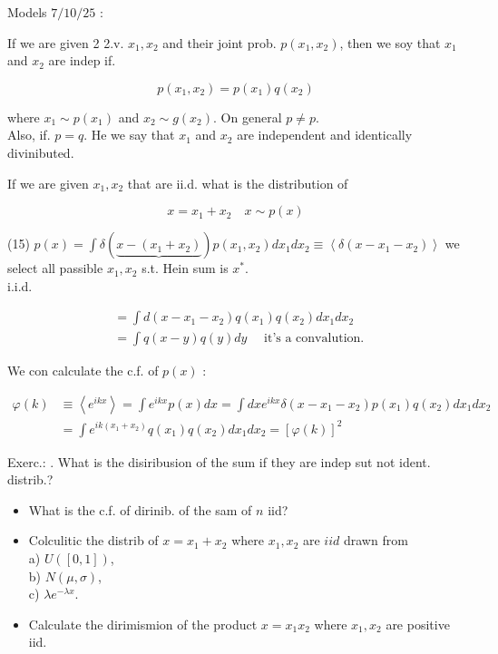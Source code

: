 \documentclass[10pt]{article}
\begin{document}
Models $7 / 10 / 25$ :

If we are given 2 2.v. $x_{1}, x_{2}$ and their joint prob. $p\left(x_{1}, x_{2}\right)$, then we soy that $x_{1}$ and $x_{2}$ are indep if.

$$
p\left(x_{1}, x_{2}\right)=p\left(x_{1}\right) q\left(x_{2}\right)
$$

where $x_{1} \sim p\left(x_{1}\right)$ and $x_{2} \sim g\left(x_{2}\right)$. On general $p \neq p$.\\
Also, if. $p=q$. He we say that $x_{1}$ and $x_{2}$ are independent and identically divinibuted.

If we are given $x_{1}, x_{2}$ that are ii.d. what is the distribution of

$$
x=x_{1}+x_{2} \quad x \sim p(x)
$$

(15) $p(x)=\int \delta(\underbrace{x-\left(x_{1}+x_{2}\right)}) p\left(x_{1}, x_{2}\right) d x_{1} d x_{2} \equiv\left\langle\delta\left(x-x_{1}-x_{2}\right)\right\rangle$ we select all passible $x_{1}, x_{2}$ s.t. Hein sum is $x^{*}$.\\
i.i.d.

$$
\begin{aligned}
& =\int d\left(x-x_{1}-x_{2}\right) q\left(x_{1}\right) q\left(x_{2}\right) d x_{1} d x_{2} \\
& =\int q(x-y) q(y) d y \quad \text { it's a convalution. }
\end{aligned}
$$

We con calculate the c.f. of $p(x)$ :


\begin{align*}
\varphi(k) & \equiv\left\langle e^{i k x}\right\rangle=\int e^{i k x} p(x) d x=\int d x e^{i k x} \delta\left(x-x_{1}-x_{2}\right) p\left(x_{1}\right) q\left(x_{2}\right) d x_{1} d x_{2} \\
& =\int e^{i k\left(x_{1}+x_{2}\right)} q\left(x_{1}\right) q\left(x_{2}\right) d x_{1} d x_{2}=[\varphi(k)]^{2} \tag{16}
\end{align*}


Exerc.: . What is the disiribusion of the sum if they are indep sut not ident. distrib.?

\begin{itemize}
  \item What is the c.f. of dirinib. of the sam of $n$ iid?
  \item Colculitic the distrib of $x=x_{1}+x_{2}$ where $x_{1}, x_{2}$ are $i i d$ drawn from\\
a) $U([0,1])$,\\
b) $N(\mu, \sigma)$,\\
c) $\lambda e^{-\lambda x}$.
  \item Calculate the dirimismion of the product $x=x_{1} x_{2}$ where $x_{1}, x_{2}$ are positive iid.
\end{itemize}
\end{document}
